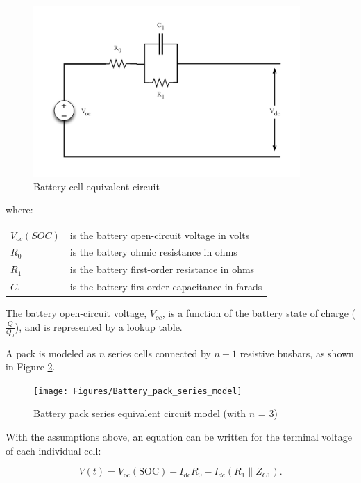 \documentclass{article}
\begin{document}
		\begin{figure}[h!]
				\centering
				\includegraphics[width=4in]{Figures/Battery_pack_equivalent_circuit}
				\caption{Battery cell equivalent circuit}
				\label{fig:battery_pack_equivalent_circuit}
		\end{figure}
		\FloatBarrier
		
		where:
		\begin{center}
		\begin{tabular}{l l}
			$V_{oc}(SOC)$	&	is the battery open-circuit voltage in volts	\\
			$R_{0}$			&	is the battery ohmic resistance in ohms \\
			$R_{1}$			& 	is the battery first-order resistance in ohms \\
			$C_{1}$			& 	is the battery firs-order capacitance in farads
		\end{tabular}
		\end{center}
		
		The battery open-circuit voltage, $V_{oc}$, is a function of the battery state of charge ($\frac{Q}{Q_0}$), and is represented by a lookup table.
		
		A pack is modeled as $n$ series cells connected by $n-1$ resistive busbars, as shown in Figure \ref{fig:Battery_pack_series_model}.
		
		\begin{figure}[h!]
				\centering
				\texttt{[image: Figures/Battery\_pack\_series\_model]}
				\caption{Battery pack series equivalent circuit model (with $n$ = 3)}
				\label{fig:Battery_pack_series_model}
		\end{figure}
		\FloatBarrier
		
		With the assumptions above, an equation can be written for the terminal voltage of each individual cell:
		
		\begin{equation}
			V(t) = V_\text{oc}(\text{SOC}) - I_\text{dc} R_0 - I_{dc}\left( R_1 \parallel Z_{C1} \right).
		\end{equation}
		
\end{document}
